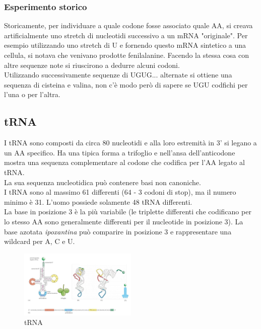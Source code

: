         \subsubsection{Esperimento storico}
            Storicamente, per individuare a quale codone fosse associato quale AA, si creava artificialmente uno stretch di nucleotidi successivo a un mRNA "originale". Per esempio utilizzando uno stretch di U e fornendo questo mRNA sintetico a una cellula, si notava che venivano prodotte fenilalanine. Facendo la stessa cosa con altre sequenze note si riuscirono a dedurre alcuni codoni.\\
            Utilizzando successivamente sequenze di UGUG... alternate si ottiene una sequenza di cisteina e valina, non c'è modo però di sapere se UGU codfichi per l'una o per l'altra.
            
    \subsection{tRNA}
        I tRNA sono composti da circa 80 nucleotidi e alla loro estremità in 3' si legano a un AA specifico. Ha una tipica forma a trifoglio e nell'ansa dell'anticodone mostra una sequenza complementare al codone che codifica per l'AA legato al tRNA.\\
        La sua sequenza nucleotidica può contenere basi non canoniche. \\
        I tRNA sono al massimo 61 differenti (64 - 3 codoni di stop), ma il numero minimo è 31. L'uomo possiede solamente 48 tRNA differenti.\\
        La base in posizione 3 è la più variabile (le triplette differenti che codificano per lo stesso AA sono generalmente differenti per il nucleotide in posizione 3). La base azotata \textit{ipoxantina} può comparire in posizione 3 e rappresentare una wildcard per A, C e U.
        \begin{figure}[h]
                \centering
                \includegraphics[width=0.5\textwidth]{images/tRNA.JPG}
                \caption{\small tRNA}
                \label{fig:mesh1}
        \end{figure}
    
